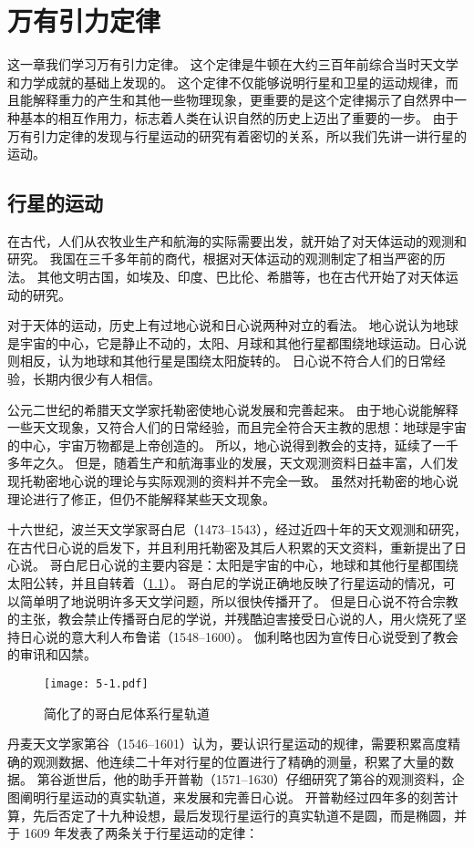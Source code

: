 \chapter{万有引力定律}\label{chp:Newton_3_law}
这一章我们学习万有引力定律。
这个定律是牛顿在大约三百年前综合当时天文学和力学成就的基础上发现的。
这个定律不仅能够说明行星和卫星的运动规律，而且能解释重力的产生和其他一些物理现象，更重要的是这个定律揭示了自然界中一种基本的相互作用力，标志着人类在认识自然的历史上迈出了重要的一步。
由于万有引力定律的发现与行星运动的研究有着密切的关系，所以我们先讲一讲行星的运动。

\section{行星的运动}
在古代，人们从农牧业生产和航海的实际需要出发，就开始了对天体运动的观测和研究。
我国在三千多年前的商代，根据对天体运动的观测制定了相当严密的历法。
其他文明古国，如埃及、印度、巴比伦、希腊等，也在古代开始了对天体运动的研究。

对于天体的运动，历史上有过地心说和日心说两种对立的看法。
地心说认为地球是宇宙的中心，它是静止不动的，太阳、月球和其他行星都围绕地球运动。日心说则相反，认为地球和其他行星是围绕太阳旋转的。
日心说不符合人们的日常经验，长期内很少有人相信。	
	
公元二世纪的希腊天文学家托勒密使地心说发展和完善起来。
由于地心说能解释一些天文现象，又符合人们的日常经验，而且完全符合天主教的思想：地球是宇宙的中心，宇宙万物都是上帝创造的。
所以，地心说得到教会的支持，延续了一千多年之久。
但是，随着生产和航海事业的发展，天文观测资料日益丰富，人们发现托勒密地心说的理论与实际观测的资料并不完全一致。
虽然对托勒密的地心说理论进行了修正，但仍不能解释某些天文现象。

十六世纪，波兰天文学家哥白尼（1473--1543），经过近四十年的天文观测和研究，在古代日心说的启发下，并且利用托勒密及其后人积累的天文资料，重新提出了日心说。
哥白尼日心说的主要内容是：太阳是宇宙的中心，地球和其他行星都围绕太阳公转，并且自转着（\cref{fig:5-1}）。
哥白尼的学说正确地反映了行星运动的情况，可以简单明了地说明许多天文学问题，所以很快传播开了。
但是日心说不符合宗教的主张，教会禁止传播哥白尼的学说，并残酷迫害接受日心说的人，用火烧死了坚持日心说的意大利人布鲁诺（1548--1600）。
伽利略也因为宣传日心说受到了教会的审讯和囚禁。
\begin{figure}
	\texttt{[image: 5-1.pdf]}
	\caption{简化了的哥白尼体系行星轨道}\label{fig:5-1}
\end{figure}

丹麦天文学家第谷（1546--1601）认为，要认识行星运动的规律，需要积累高度精确的观测数据、他连续二十年对行星的位置进行了精确的测量，积累了大量的数据。
第谷逝世后，他的助手开普勒（1571--1630）仔细研究了第谷的观测资料，企图阐明行星运动的真实轨道，来发展和完善日心说。
开普勒经过四年多的刻苦计算，先后否定了十九种设想，最后发现行星运行的真实轨道不是圆，而是椭圆，并于 1609 年发表了两条关于行星运动的定律：

